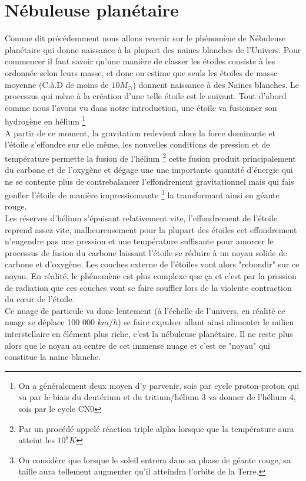 \documentclass[a4paper]{rapport}
\begin{document}
\section{Nébuleuse planétaire}
Comme dit précédemment nous allons revenir sur le phénomène de Nébuleuse planétaire qui donne naissance à la plupart des naines blanches de l'Univers.\nl
Pour commencer il faut savoir qu'une manière de classer les étoiles consiste à les ordonnée selon leurs masse, et donc on estime que seuls les étoiles de masse moyenne (C.à.D de moins de $10M_{\odot}$) donnent naissance à des Naines blanches. Le processus qui mène à la création d'une telle étoile est le suivant.\nl
Tout d'abord comme nous l'avons vu dans notre introduction, une étoile va fusionner son hydrogène en hélium \footnote{On a généralement deux moyen d'y parvenir, sois par cycle proton-proton qui va par le biais du deutérium et du tritium/hélium 3 va donner de l'hélium 4, sois par le cycle CN0}\\
A partir de ce moment, la gravitation redevient alors la force dominante et l'étoile s’effondre sur elle même, les nouvelles conditions de pression et de température permette la fusion de l’hélium \footnote{Par un procédé appelé réaction triple alpha lorsque que la température aura atteint les $10^8 K$} cette fusion produit principalement du carbone et de l'oxygène et dégage une une importante quantité d'énergie qui ne se contente plus de contrebalancer l'effondrement gravitationnel mais qui fais gonfler l'étoile de manière impressionnante \footnote{On considère que lorsque le soleil entrera dans sa phase de géante rouge, sa taille aura tellement augmenter qu'il atteindra l'orbite de la Terre.} la transformant ainsi en géante rouge.\\
Les réserves d'hélium s’épuisant relativement vite, l’effondrement de l'étoile reprend assez vite, malheureusement pour la plupart des étoiles cet effondrement n'engendre pas une pression et une température suffisante pour amorcer le processus de fusion du carbone laissant l'étoile se réduire à un noyau solide de carbone et d'oxygène. Les couches externe de l'étoiles vont alors "rebondir" sur ce noyau. En réalité, le phénomène est plus complexe que ça et c'est par la pression de radiation que ces couches vont se faire souffler lors de la violente contraction du cœur de l'étoile.\\
Ce nuage de particule va donc lentement (à l'échelle de l'univers, en réalité ce nuage se déplace 100 000 $km/h$) se faire expulser allant ainsi alimenter le milieu interstellaire en élément plus riche, c'est la nébuleuse planétaire. Il ne reste plus alors que le noyau au centre de cet immense nuage et c'est ce "noyau" qui constitue la naine blanche.
\end{document}
